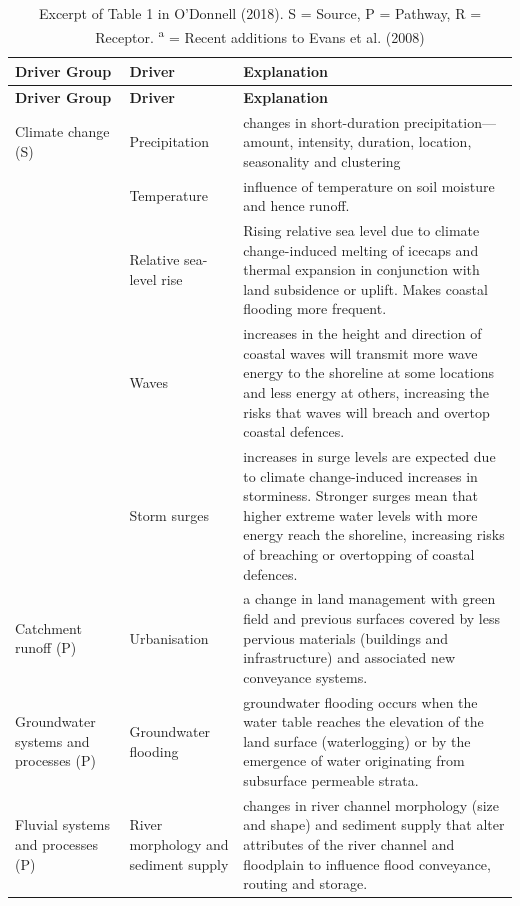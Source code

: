 \begin{singlespace}
\begin{longtable}{L{2.5cm} L{3cm} L{8cm}} \caption{Excerpt of Table 1 in
O'Donnell (2018). S = Source, P = Pathway, R = Receptor. \textsuperscript{a} =
Recent additions to Evans et al. (2008)} \\
\toprule
\textbf{Driver Group} & \textbf{Driver} & \textbf{Explanation} \\
\midrule
\endfirsthead

\toprule
\textbf{Driver Group} & \textbf{Driver} & \textbf{Explanation} \\
\midrule
\endhead

Climate change (S) & Precipitation & changes in short-duration precipitation—amount, intensity, duration, location, seasonality and clustering \\
                   & Temperature & influence of temperature on soil moisture and
                   hence runoff. \\
                   & Relative sea-level rise & Rising relative sea level due to climate change-induced melting of icecaps and thermal expansion in conjunction with land subsidence or uplift. Makes coastal flooding more frequent. \\
                   & Waves & increases in the height and direction of coastal waves will transmit more wave energy to the shoreline at some locations and less energy at others, increasing the risks that waves will breach and overtop coastal defences. \\
                   & Storm surges & increases in surge levels are expected due to climate change-induced increases in storminess. Stronger surges mean that higher extreme water levels with more energy reach the shoreline, increasing risks of breaching or overtopping of coastal defences. \\
\midrule
Catchment runoff (P) & Urbanisation & a change in land management with green field and previous surfaces covered by less pervious materials (buildings and infrastructure) and associated new conveyance systems. \\
\midrule
Groundwater systems and processes (P) & Groundwater flooding & groundwater flooding occurs when the water table reaches the elevation of the land surface (waterlogging) or by the emergence of water originating from subsurface permeable strata. \\
\midrule
Fluvial systems and processes (P) & River morphology and sediment supply & changes in river channel morphology (size and shape) and sediment supply that alter attributes of the river channel and floodplain to influence flood conveyance, routing and storage. \\

\end{longtable}
\end{singlespace}
